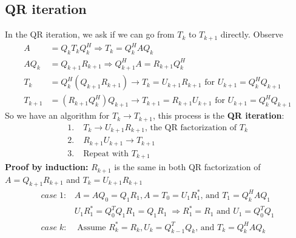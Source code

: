 \documentclass{article}
\begin{document}
\subsection{QR iteration}
In the QR iteration, we ask if we can go from $T_k$ to $T_{k+1}$ directly. Observe
\begin{align*}
    A &= Q_k T_k Q_k^H \Longrightarrow T_k = Q_k^HAQ_k\\
    AQ_k &= Q_{k+1}R_{k+1} \Longrightarrow Q_{k+1}^HA = R_{k+1}Q_k^H\\
    T_k &= Q_k^H(Q_{k+1}R_{k+1}) \longrightarrow T_k = U_{k+1} R_{k+1} \textrm{ for } U_{k+1} = Q_k^HQ_{k+1}\\
    T_{k+1} &= (R_{k+1}Q_k^H)Q_{k+1} \longrightarrow T_{k+1} = R_{k+1}U_{k+1} \textrm{ for } U_{k+1} = Q_k^HQ_{k+1}
\end{align*} 
So we have an algorithm for $T_k \rightarrow T_{k+1}$, this process is the \textbf{QR iteration}:
\begin{align*}
    1. \;& T_k \longrightarrow U_{k+1}R_{k+1} \textrm{, the QR factorization of } T_k\\
    2. \;&R_{k+1}U_{k+1} \longrightarrow T_{k+1}\\
    3. \;&\textrm{Repeat with } T_{k+1}
\end{align*}
\textbf{Proof by induction:} $R_{k+1}$ is the same in both QR factorization of $A = Q_{k+1}R_{k+1}$ and $T_k = U_{k+1}R_{k+1}$
\begin{align*}
    case \; 1: &A = AQ_0 = Q_1R_1, A = T_0 =U_1R_1^* \textrm{, and } T_1 = Q_k^HAQ_1\\
    &U_1R_1^* = Q_0^TQ_1R_1 = Q_1R_1 \; \Longrightarrow R_1^* = R_1 \textrm{ and } U_1 = Q_0^TQ_1\\
    case \; k: & \textrm{ Assume } R_k^* = R_k, U_k = Q_{k-1}^TQ_k \textrm{, and } T_k = Q_k^HAQ_k
\end{align*}
\end{document}
